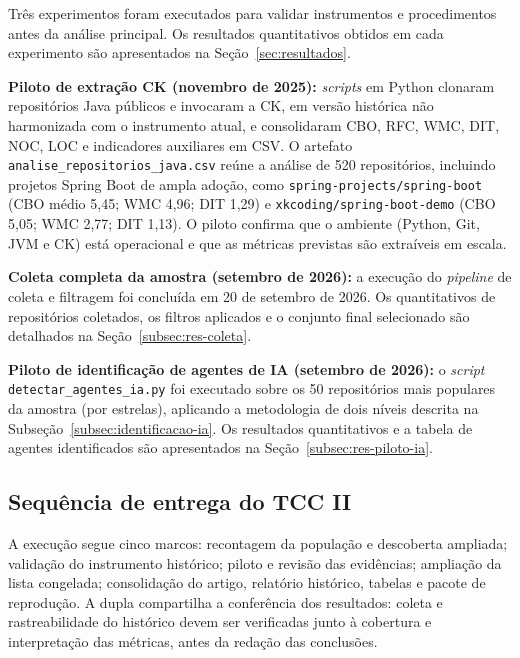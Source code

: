 Três experimentos foram executados para validar instrumentos e procedimentos antes da análise principal. Os resultados quantitativos obtidos em cada experimento são apresentados na Seção~\ref{sec:resultados}.

\textbf{Piloto de extração CK (novembro de 2025):} \emph{scripts} em Python clonaram repositórios Java públicos e invocaram a CK, em versão histórica não harmonizada com o instrumento atual, e consolidaram CBO, RFC, WMC, DIT, NOC, LOC e indicadores auxiliares em CSV. O artefato \texttt{analise\_repositorios\_java.csv} reúne a análise de 520 repositórios, incluindo projetos Spring Boot de ampla adoção, como \texttt{spring-projects/spring-boot} (CBO médio 5,45; WMC 4,96; DIT 1,29) e \texttt{xkcoding/spring-boot-demo} (CBO 5,05; WMC 2,77; DIT 1,13). O piloto confirma que o ambiente (Python, Git, JVM e CK) está operacional e que as métricas previstas são extraíveis em escala.

\textbf{Coleta completa da amostra (setembro de 2026):} a execução do \emph{pipeline} de coleta e filtragem foi concluída em 20 de setembro de 2026. Os quantitativos de repositórios coletados, os filtros aplicados e o conjunto final selecionado são detalhados na Seção~\ref{subsec:res-coleta}.

\textbf{Piloto de identificação de agentes de IA (setembro de 2026):} o \emph{script} \texttt{detectar\_agentes\_ia.py} foi executado sobre os 50 repositórios mais populares da amostra (por estrelas), aplicando a metodologia de dois níveis descrita na Subseção~\ref{subsec:identificacao-ia}. Os resultados quantitativos e a tabela de agentes identificados são apresentados na Seção~\ref{subsec:res-piloto-ia}.


\subsection{Sequência de entrega do TCC II}
\label{subsec:cronograma}

A execução segue cinco marcos: recontagem da população e descoberta ampliada; validação do instrumento histórico; piloto e revisão das evidências; ampliação da lista congelada; consolidação do artigo, relatório histórico, tabelas e pacote de reprodução. A dupla compartilha a conferência dos resultados: coleta e rastreabilidade do histórico devem ser verificadas junto à cobertura e interpretação das métricas, antes da redação das conclusões.
